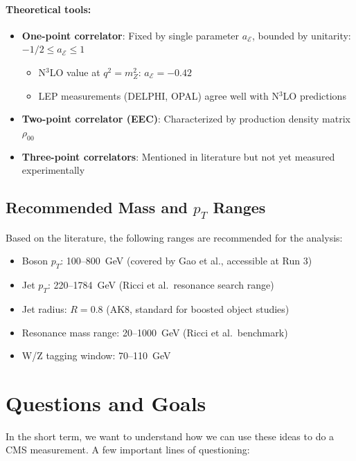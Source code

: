 \documentclass[11pt]{article}
\begin{document}
\paragraph{Theoretical tools:}
\begin{itemize}
    \item \textbf{One-point correlator}: Fixed by single parameter $a_{\mathcal{E}}$, bounded by unitarity: $-1/2 \leq a_{\mathcal{E}} \leq 1$
    \begin{itemize}
        \item N$^3$LO value at $q^2 = m_Z^2$: $a_{\mathcal{E}} = -0.42$
        \item LEP measurements (DELPHI, OPAL) agree well with N$^3$LO predictions
    \end{itemize}
    \item \textbf{Two-point correlator (EEC)}: Characterized by production density matrix $\rho_{00}$
    \item \textbf{Three-point correlators}: Mentioned in literature but not yet measured experimentally
\end{itemize}

\subsection{Recommended Mass and \texorpdfstring{$p_T$}{pT} Ranges}

Based on the literature, the following ranges are recommended for the analysis:
\begin{itemize}
    \item Boson $p_T$: 100--800~GeV (covered by Gao et al., accessible at Run 3)
    \item Jet $p_T$: 220--1784~GeV (Ricci et al.\ resonance search range)
    \item Jet radius: $R = 0.8$ (AK8, standard for boosted object studies)
    \item Resonance mass range: 20--1000~GeV (Ricci et al.\ benchmark)
    \item W/Z tagging window: 70--110~GeV
\end{itemize}

\section{Questions and Goals}

In the short term, we want to understand how we can use these ideas to do a CMS measurement.
A few important lines of questioning:
\end{document}
